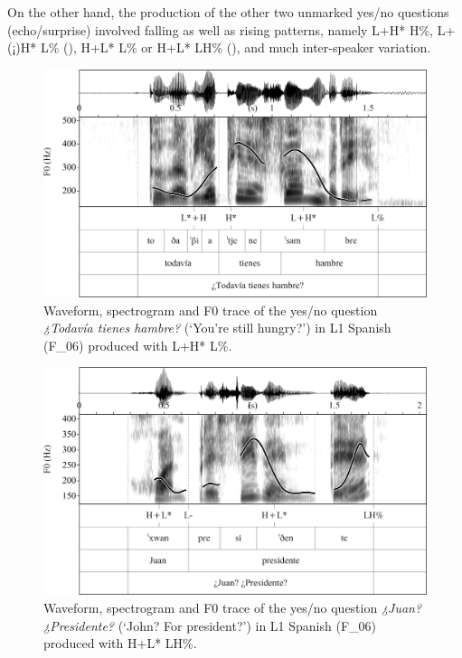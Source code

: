 On the other hand, the production of the other two unmarked yes/no questions (echo/surprise) involved falling as well as rising patterns, namely L+H* H\%, L+(¡)H* L\% (), H+L* L\% or H+L* LH\% (), and much inter-speaker variation.

\begin{figure}


\includegraphics[width=\textwidth]{figures/Figure_4.56.png}



\caption{Waveform, spectrogram and F0 trace of the yes/no question \textit{¿Todavía tienes hambre?} (‘You’re still hungry?’) in L1 Spanish \mbox{(F\_06)} produced with L+H* L\%.}
\label{fig:4.56}
\end{figure}

\begin{figure}


\includegraphics[width=\textwidth]{figures/Figure_4.57.png}



\caption{Waveform, spectrogram and F0 trace of the yes/no question \textit{¿Juan? ¿Presidente?} (‘John? For president?’) in L1 Spanish (F\_06) produced with H+L* LH\%.}
\label{fig:4.57}
\end{figure}


